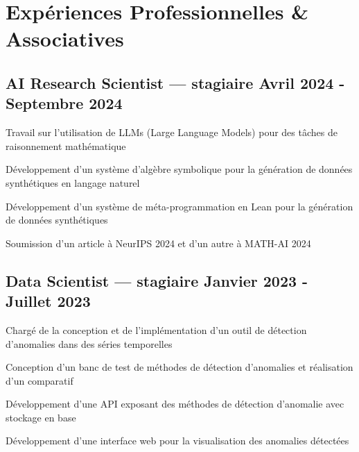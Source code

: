 \section{Expériences Professionnelles \& Associatives}
\vspace{0.1cm}

\subsection{{AI Research Scientist --- stagiaire \hfill Avril 2024 - Septembre 2024}}
\begin{zitemize}
    \item Travail sur l'utilisation de LLMs (Large Language Models) pour des tâches de raisonnement mathématique
    \item Développement d'un système d'algèbre symbolique pour la génération de données synthétiques en langage naturel
    \item Développement d'un système de méta-programmation en Lean pour la génération de données synthétiques
    \item Soumission d'un article à NeurIPS 2024 et d'un autre à MATH-AI 2024
\end{zitemize}
\vspace{0.1cm}

\subsection{{Data Scientist --- stagiaire \hfill Janvier 2023 - Juillet 2023}}
\begin{zitemize}
    \item Chargé de la conception et de l'implémentation d'un outil de détection d'anomalies dans des séries temporelles
    \item Conception d'un banc de test de méthodes de détection d'anomalies et réalisation d'un comparatif
    \item Développement d'une API exposant des méthodes de détection d'anomalie avec stockage en base
    \item Développement d'une interface web pour la visualisation des anomalies détectées
\end{zitemize}
\vspace{0.1cm}

